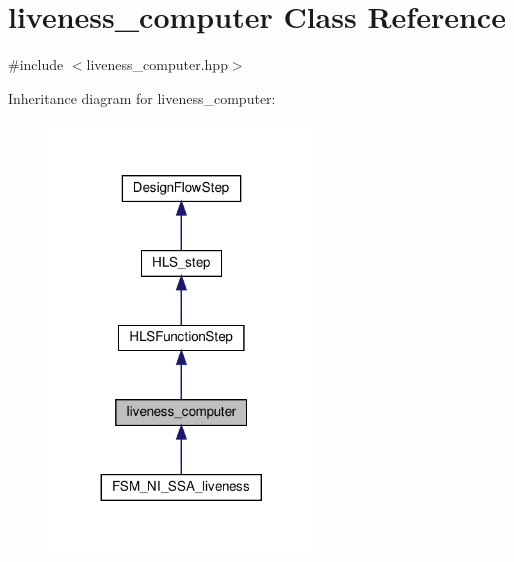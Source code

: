 \hypertarget{classliveness__computer}{}\section{liveness\+\_\+computer Class Reference}
\label{classliveness__computer}


{\ttfamily \#include $<$liveness\+\_\+computer.\+hpp$>$}



Inheritance diagram for liveness\+\_\+computer\+:
\nopagebreak
\begin{figure}[H]
\begin{center}
\leavevmode
\includegraphics[width=200pt]{d6/d1e/classliveness__computer__inherit__graph}
\end{center}
\end{figure}


